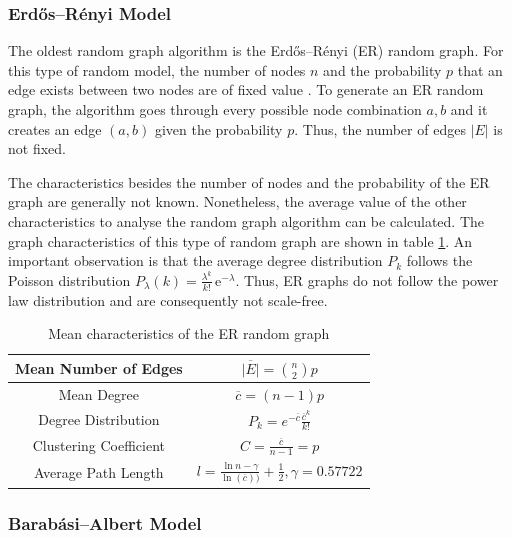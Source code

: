 \subsubsection{Erdős–Rényi Model}

The oldest random graph algorithm is the 
Erdős–Rényi (ER) random graph. For this type of random model, the
number of nodes $n$ and the probability $p$ that an 
edge exists between two nodes are of fixed value \cite{basicnetwork}. 
To generate an ER random graph, the algorithm goes through 
every possible node combination $a, b$ and it creates an edge 
$(a, b)$ given the probability $p$. 
Thus, the number of edges $|E|$ is not fixed.

The characteristics besides the number of nodes and the
probability of the ER graph are generally not known.
Nonetheless, the average value of the other
characteristics to analyse the random graph algorithm can be calculated.
The graph characteristics of this type of random graph are shown in table 
\ref{erdos-model}.
An important observation is that 
the average degree distribution $P_k$ follows the Poisson distribution
$P_\lambda (k) = \frac{\lambda^k}{k!}\, \mathrm{e}^{-\lambda}$. Thus,
ER graphs do not follow the power law distribution and are consequently
not scale-free. 

\begin{table}[ht!]
    \centering
    \begin{tabular}{|c | c |} 
     \hline
     Mean Number of Edges & 
     $\overline{|E|} = \binom{n}{2}p$  \\ 
     \hline
     Mean Degree & 
     $\overline{c} = (n-1)p$ \\ 
     \hline
     Degree Distribution & 
     $P_k = e^{-\overline{c}} \frac{\overline{c}^k}{k!}$ \\ 
     \hline
     Clustering Coefficient & 
     $C=\frac{\overline{c}}{n-1}=p$ \\ 
     \hline
     Average Path Length \cite{averagepath}& 
     $l = \frac{\ln{n} - \gamma}{\ln(\overline{c}))} + \frac{1}{2}, 
     \gamma=0.57722$ \\ 
     \hline
    \end{tabular}
    \caption{Mean characteristics of the ER random graph \cite{basicnetwork}}
    \label{erdos-model}
\end{table}

\subsubsection{Barabási–Albert Model}

